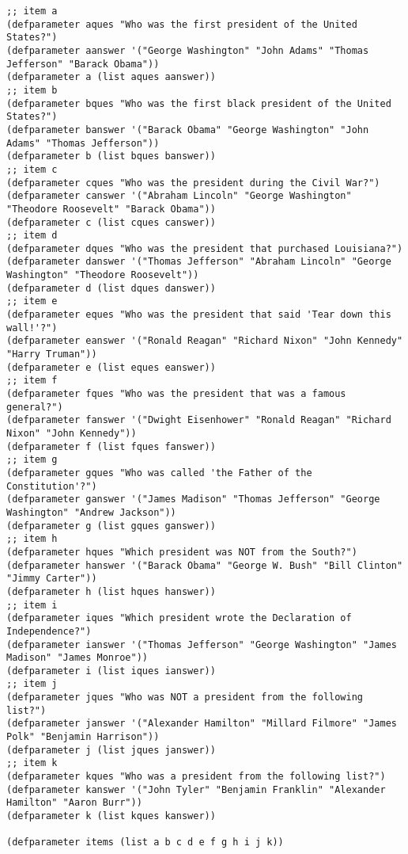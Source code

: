 \documentclass{article}
\begin{document}
\lstset{language=Lisp,numbers=left,keepspaces=false,basicstyle=\small,numberstyle=\tiny,breaklines=true,showstringspaces=false}
\begin{lstlisting}[caption = test-q-and-a.lisp]
;; item a
(defparameter aques "Who was the first president of the United States?")
(defparameter aanswer '("George Washington" "John Adams" "Thomas Jefferson" "Barack Obama"))
(defparameter a (list aques aanswer))
;; item b
(defparameter bques "Who was the first black president of the United States?")
(defparameter banswer '("Barack Obama" "George Washington" "John Adams" "Thomas Jefferson"))
(defparameter b (list bques banswer))
;; item c
(defparameter cques "Who was the president during the Civil War?")
(defparameter canswer '("Abraham Lincoln" "George Washington" "Theodore Roosevelt" "Barack Obama"))
(defparameter c (list cques canswer))
;; item d
(defparameter dques "Who was the president that purchased Louisiana?")
(defparameter danswer '("Thomas Jefferson" "Abraham Lincoln" "George Washington" "Theodore Roosevelt"))
(defparameter d (list dques danswer))
;; item e
(defparameter eques "Who was the president that said 'Tear down this wall!'?")
(defparameter eanswer '("Ronald Reagan" "Richard Nixon" "John Kennedy" "Harry Truman"))
(defparameter e (list eques eanswer))
;; item f
(defparameter fques "Who was the president that was a famous general?")
(defparameter fanswer '("Dwight Eisenhower" "Ronald Reagan" "Richard Nixon" "John Kennedy"))
(defparameter f (list fques fanswer))
;; item g
(defparameter gques "Who was called 'the Father of the Constitution'?")
(defparameter ganswer '("James Madison" "Thomas Jefferson" "George Washington" "Andrew Jackson"))
(defparameter g (list gques ganswer))
;; item h
(defparameter hques "Which president was NOT from the South?")
(defparameter hanswer '("Barack Obama" "George W. Bush" "Bill Clinton" "Jimmy Carter"))
(defparameter h (list hques hanswer))
;; item i
(defparameter iques "Which president wrote the Declaration of Independence?")
(defparameter ianswer '("Thomas Jefferson" "George Washington" "James Madison" "James Monroe"))
(defparameter i (list iques ianswer))
;; item j
(defparameter jques "Who was NOT a president from the following list?")
(defparameter janswer '("Alexander Hamilton" "Millard Filmore" "James Polk" "Benjamin Harrison"))
(defparameter j (list jques janswer))
;; item k
(defparameter kques "Who was a president from the following list?")
(defparameter kanswer '("John Tyler" "Benjamin Franklin" "Alexander Hamilton" "Aaron Burr"))
(defparameter k (list kques kanswer))

(defparameter items (list a b c d e f g h i j k))
\end{lstlisting}
\end{document}
